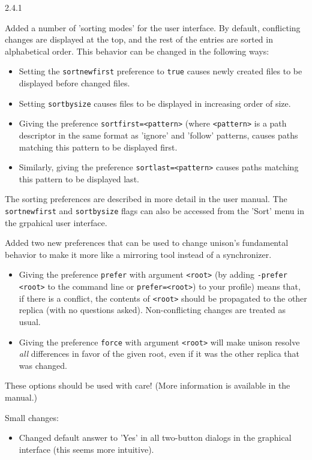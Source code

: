\begin{changesfromversion}{2.4.1}
\item Added a number of 'sorting modes' for the user interface.  By
default, conflicting changes are displayed at the top, and the rest of
the entries are sorted in alphabetical order.  This behavior can be
changed in the following ways:
\begin{itemize}
\item Setting  the \verb|sortnewfirst| preference to \verb|true| causes
newly created files to be displayed before changed files.
\item Setting \verb|sortbysize| causes files to be displayed in
increasing order of size.
\item Giving the preference \verb|sortfirst=<pattern>| (where
\verb|<pattern>| is a path descriptor in the same format as 'ignore' and 'follow'
patterns, causes paths matching this pattern to be displayed first.
\item Similarly, giving the preference \verb|sortlast=<pattern>| 
causes paths matching this pattern to be displayed last.
\end{itemize}
The sorting preferences are described in more detail in the user manual.
The \verb|sortnewfirst| and \verb|sortbysize| flags can also be accessed
from the 'Sort' menu in the grpahical user interface.

\item Added two new preferences that can be used to change unison's
fundamental behavior to make it more like a mirroring tool instead of
a synchronizer.
\begin{itemize}
\item Giving the preference \verb|prefer| with argument \verb|<root>|
(by adding \verb|-prefer <root>| to the command line or \verb|prefer=<root>|)
to your profile) means that, if there is a conflict, the contents of
\verb|<root>| 
should be propagated to the other replica (with no questions asked).
Non-conflicting changes are treated as usual.
\item Giving the preference \verb|force| with argument \verb|<root>|
will make unison resolve {\em all} differences in favor of the given
root, even if it was the other replica that was changed.
\end{itemize}
These options should be used with care!  (More information is available in
the manual.)

\item Small changes:
\begin{itemize}
\item 
Changed default answer to 'Yes' in all two-button dialogs in the 
  graphical interface (this seems more intuitive).


\end{itemize}
\end{changesfromversion}
